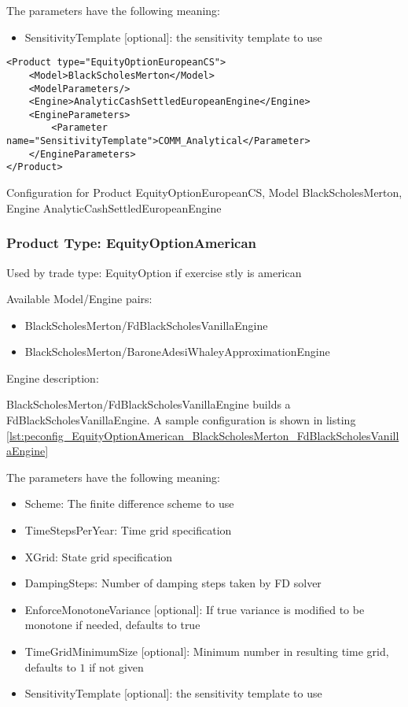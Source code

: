 The parameters have the following meaning:

\begin{itemize}
\item SensitivityTemplate [optional]: the sensitivity template to use 
\end{itemize}

\begin{longlisting}
\begin{verbatim}
<Product type="EquityOptionEuropeanCS">
    <Model>BlackScholesMerton</Model>
    <ModelParameters/>
    <Engine>AnalyticCashSettledEuropeanEngine</Engine>
    <EngineParameters>
        <Parameter name="SensitivityTemplate">COMM_Analytical</Parameter>
    </EngineParameters>
</Product>
\end{verbatim}
\caption{Configuration for Product EquityOptionEuropeanCS, Model BlackScholesMerton, Engine AnalyticCashSettledEuropeanEngine}
\label{lst:peconfig_EquityOptionEuropeanCS_BlackScholesMerton_AnalyticCashSettledEuropeanEngine}
\end{longlisting}

\subsubsection{Product Type: EquityOptionAmerican}

Used by trade type: EquityOption if exercise stly is american

Available Model/Engine pairs:

\begin{itemize}
\item BlackScholesMerton/FdBlackScholesVanillaEngine
\item BlackScholesMerton/BaroneAdesiWhaleyApproximationEngine
\end{itemize}

Engine description:

BlackScholesMerton/FdBlackScholesVanillaEngine builds a FdBlackScholesVanillaEngine. A sample configuration is shown in listing
\ref{lst:peconfig_EquityOptionAmerican_BlackScholesMerton_FdBlackScholesVanillaEngine}

The parameters have the following meaning:

\begin{itemize}
\item Scheme: The finite difference scheme to use
\item TimeStepsPerYear: Time grid specification
\item XGrid: State grid specification
\item DampingSteps: Number of damping steps taken by FD solver
\item EnforceMonotoneVariance [optional]: If true variance is modified to be monotone if needed, defaults to true
\item TimeGridMinimumSize [optional]: Minimum number in resulting time grid, defaults to $1$ if not given
\item SensitivityTemplate [optional]: the sensitivity template to use 
\end{itemize}

